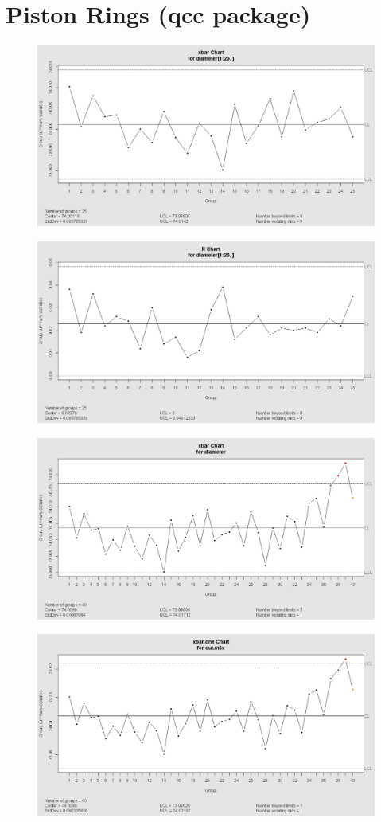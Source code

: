 \documentclass[a4paper,12pt]{article}
\begin{document}
\section{Piston Rings (qcc package)}

\begin{figure}[h!]
\centering
\includegraphics[width=0.7\linewidth]{./qccpistonrings-control}
\caption{}
\label{fig:qccpistonrings-control}
\end{figure}
\begin{figure}[h!]
\centering
\includegraphics[width=0.7\linewidth]{./qccpistonrings-rchart}
\caption{}
\label{fig:qccpistonrings-rchart}
\end{figure}
\newpage
\begin{figure}[h!]
\centering
\includegraphics[width=0.7\linewidth]{./qccpistonrings-xbar2}
\caption{}
\label{fig:qccpistonrings-xbar2}
\end{figure}
\begin{figure}[h!]
\centering
\includegraphics[width=0.7\linewidth]{./qccpistonrings-xbarone}
\caption{}
\label{fig:qccpistonrings-xbarone}
\end{figure}
\end{document}
